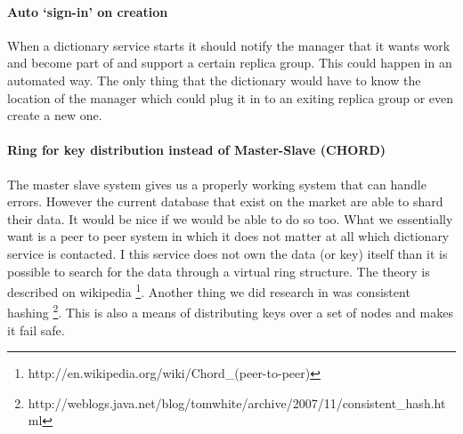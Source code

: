 \documentclass[12pt,a4paper]{scrartcl}
\begin{document}
\paragraph{Auto `sign-in' on creation}
When a dictionary service starts it should notify the manager that it wants work and become part of and support a certain replica group. This could happen in an automated way. The only thing that the dictionary would have to know the location of the manager which could plug it in to an exiting replica group or even create a new one.

\paragraph{Ring for key distribution instead of Master-Slave (CHORD)}
The master slave system gives us a properly working system that can handle errors. However the current database that exist on the market are able to shard their data. It would be nice if we would be able to do so too. What we essentially want is a peer to peer system in which it does not matter at all which dictionary service is contacted. I this service does not own the data (or key) itself than it is possible to search for the data through a virtual ring structure. The theory is described on wikipedia \footnote{http://en.wikipedia.org/wiki/Chord\_(peer-to-peer)}. Another thing we did research in was consistent hashing \footnote{http://weblogs.java.net/blog/tomwhite/archive/2007/11/consistent\_hash.html}. This is also a means of distributing keys over a set of nodes and makes it fail safe.






\nocite{*}
\end{document}
